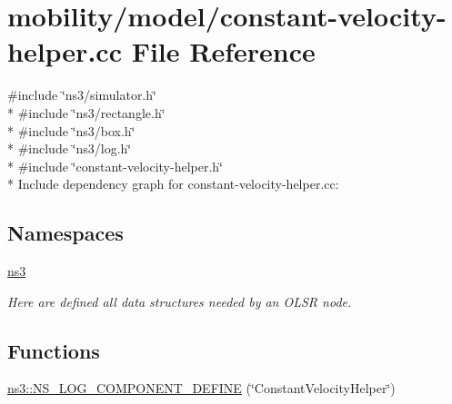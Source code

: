 \hypertarget{constant-velocity-helper_8cc}{}\section{mobility/model/constant-\/velocity-\/helper.cc File Reference}
\label{constant-velocity-helper_8cc}
{\ttfamily \#include \char`\"{}ns3/simulator.\+h\char`\"{}}\\*
{\ttfamily \#include \char`\"{}ns3/rectangle.\+h\char`\"{}}\\*
{\ttfamily \#include \char`\"{}ns3/box.\+h\char`\"{}}\\*
{\ttfamily \#include \char`\"{}ns3/log.\+h\char`\"{}}\\*
{\ttfamily \#include \char`\"{}constant-\/velocity-\/helper.\+h\char`\"{}}\\*
Include dependency graph for constant-\/velocity-\/helper.cc\+:
\subsection*{Namespaces}
\begin{DoxyCompactItemize}
\item 
 \hyperlink{namespacens3}{ns3}
\begin{DoxyCompactList}\small\item\em Here are defined all data structures needed by an O\+L\+SR node. \end{DoxyCompactList}\end{DoxyCompactItemize}
\subsection*{Functions}
\begin{DoxyCompactItemize}
\item 
\hyperlink{namespacens3_a4e98332c41a656b7c8447a2799d48b10}{ns3\+::\+N\+S\+\_\+\+L\+O\+G\+\_\+\+C\+O\+M\+P\+O\+N\+E\+N\+T\+\_\+\+D\+E\+F\+I\+NE} (\char`\"{}Constant\+Velocity\+Helper\char`\"{})
\end{DoxyCompactItemize}
